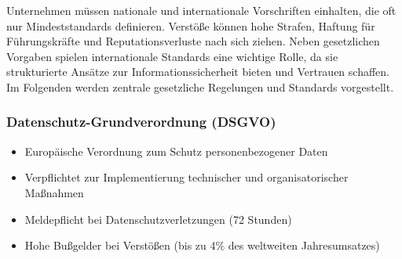 \documentclass{orgstandard}
\begin{document}
\begin{NOTES}
Unternehmen müssen nationale und internationale Vorschriften einhalten, die oft nur Mindeststandards definieren. Verstöße können hohe Strafen, Haftung für Führungskräfte und Reputationsverluste nach sich ziehen. Neben gesetzlichen Vorgaben spielen internationale Standards eine wichtige Rolle, da sie strukturierte Ansätze zur Informationssicherheit bieten und Vertrauen schaffen. Im Folgenden werden zentrale gesetzliche Regelungen und Standards vorgestellt.
\end{NOTES}
\subsubsection{Datenschutz-Grundverordnung (DSGVO)}
\label{sec:org52913d2}
\begin{itemize}
\item Europäische Verordnung zum Schutz personenbezogener Daten
\item Verpflichtet zur Implementierung technischer und organisatorischer Maßnahmen
\item Meldepflicht bei Datenschutzverletzungen (72 Stunden)
\item Hohe Bußgelder bei Verstößen (bis zu 4\% des weltweiten Jahresumsatzes)
\end{itemize}
\end{document}
